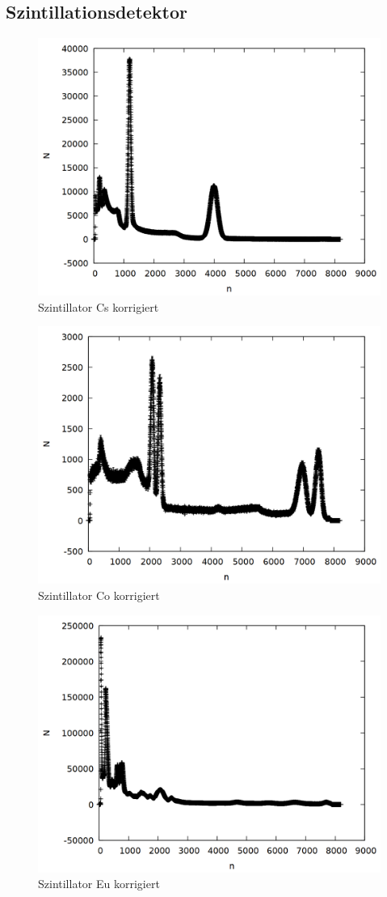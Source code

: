\subsection{Szintillationsdetektor}
\begin{figure}
\centering
\includegraphics[width=0.7\linewidth]{data/si_cs.png}
\caption{Szintillator Cs korrigiert}
\label{fig:si_cs}
\end{figure}

\begin{figure}
\centering
\includegraphics[width=0.7\linewidth]{data/si_co.png}
\caption{Szintillator Co korrigiert}
\label{fig:si_co}
\end{figure}

\begin{figure}
\centering
\includegraphics[width=0.7\linewidth]{data/si_eu.png}
\caption{Szintillator Eu korrigiert}
\label{fig:si_eu}
\end{figure}

